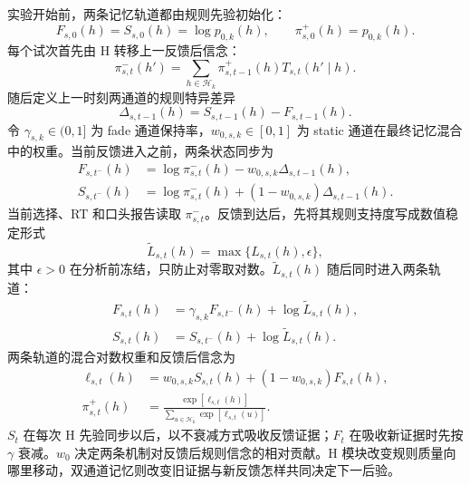 实验开始前，两条记忆轨道都由规则先验初始化：
\begin{equation}
    F_{s,0}(h)=S_{s,0}(h)=\log p_{0,k}(h),
    \qquad
    \pi^+_{s,0}(h)=p_{0,k}(h).
    \label{eq:model0803-memory-initial}
\end{equation}
每个试次首先由 H 转移上一反馈后信念：
\begin{equation}
    \pi^-_{s,t}(h')
    =
    \sum_{h\in\mathcal H_k}
    \pi^+_{s,t-1}(h)T_{s,t}(h'\mid h).
    \label{eq:model0803-h-position}
\end{equation}
随后定义上一时刻两通道的规则特异差异
\begin{equation}
    \Delta_{s,t-1}(h)
    =S_{s,t-1}(h)-F_{s,t-1}(h).
    \label{eq:model0803-memory-offset}
\end{equation}
令 $\gamma_{s,k}\in(0,1]$ 为 fade 通道保持率，$w_{0,s,k}\in[0,1]$ 为 static 通道在最终记忆混合中的权重。当前反馈进入之前，两条状态同步为
\begin{align}
    F_{s,t^-}(h)
    &=\log\pi^-_{s,t}(h)
      -w_{0,s,k}\Delta_{s,t-1}(h),\\
    S_{s,t^-}(h)
    &=\log\pi^-_{s,t}(h)
      +(1-w_{0,s,k})\Delta_{s,t-1}(h).
    \label{eq:model0803-memory-sync}
\end{align}
当前选择、RT 和口头报告读取 $\pi^-_{s,t}$。反馈到达后，先将其规则支持度写成数值稳定形式
\begin{equation}
    \widetilde L_{s,t}(h)
    =\max\{L_{s,t}(h),\epsilon\},
    \label{eq:model0803-effective-likelihood}
\end{equation}
其中 $\epsilon>0$ 在分析前冻结，只防止对零取对数。$\widetilde L_{s,t}(h)$ 随后同时进入两条轨道：
\begin{align}
    F_{s,t}(h)
    &=\gamma_{s,k}F_{s,t^-}(h)
      +\log\widetilde L_{s,t}(h),\\
    S_{s,t}(h)
    &=S_{s,t^-}(h)
      +\log\widetilde L_{s,t}(h).
    \label{eq:model0803-dual-memory-update}
\end{align}
两条轨道的混合对数权重和反馈后信念为
\begin{align}
    \ell_{s,t}(h)
    &=w_{0,s,k}S_{s,t}(h)
      +(1-w_{0,s,k})F_{s,t}(h),\\
    \pi^+_{s,t}(h)
    &=\frac{\exp[\ell_{s,t}(h)]}
      {\sum_{u\in\mathcal H_k}\exp[\ell_{s,t}(u)]}.
    \label{eq:model0803-feedback-posterior}
\end{align}
$S_t$ 在每次 H 先验同步以后，以不衰减方式吸收反馈证据；$F_t$ 在吸收新证据时先按 $\gamma$ 衰减。$w_0$ 决定两条机制对反馈后规则信念的相对贡献。H 模块改变规则质量向哪里移动，双通道记忆则改变旧证据与新反馈怎样共同决定下一后验。

